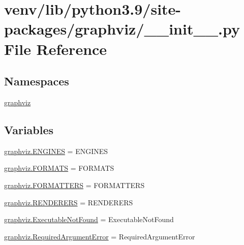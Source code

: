 \hypertarget{venv_2lib_2python3_89_2site-packages_2graphviz_2____init_____8py}{}\section{venv/lib/python3.9/site-\/packages/graphviz/\+\_\+\+\_\+init\+\_\+\+\_\+.py File Reference}
\label{venv_2lib_2python3_89_2site-packages_2graphviz_2____init_____8py}
\subsection*{Namespaces}
\begin{DoxyCompactItemize}
\item 
 \hyperlink{namespacegraphviz}{graphviz}
\end{DoxyCompactItemize}
\subsection*{Variables}
\begin{DoxyCompactItemize}
\item 
\hyperlink{namespacegraphviz_ad6098d40fefdce1124ba066a2d03b5d9}{graphviz.\+E\+N\+G\+I\+N\+ES} = E\+N\+G\+I\+N\+ES
\item 
\hyperlink{namespacegraphviz_af97936c02ddd58ea6608447cabe9661b}{graphviz.\+F\+O\+R\+M\+A\+TS} = F\+O\+R\+M\+A\+TS
\item 
\hyperlink{namespacegraphviz_a5f85aa7d9e9aaebc186236b2f627f02c}{graphviz.\+F\+O\+R\+M\+A\+T\+T\+E\+RS} = F\+O\+R\+M\+A\+T\+T\+E\+RS
\item 
\hyperlink{namespacegraphviz_adf6e44b05987a0b045c3977928febee9}{graphviz.\+R\+E\+N\+D\+E\+R\+E\+RS} = R\+E\+N\+D\+E\+R\+E\+RS
\item 
\hyperlink{namespacegraphviz_aa84862b7d9c9f008e138ed79492843c8}{graphviz.\+Executable\+Not\+Found} = Executable\+Not\+Found
\item 
\hyperlink{namespacegraphviz_a907ef4565e438e1306385930a4032577}{graphviz.\+Required\+Argument\+Error} = Required\+Argument\+Error
\end{DoxyCompactItemize}
